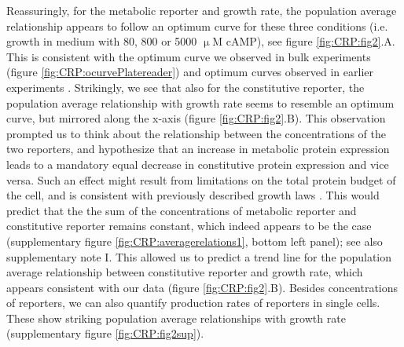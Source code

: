 Reassuringly,
for the metabolic reporter and growth rate,
the population average relationship appears to follow an optimum curve for these three conditions (i.e. growth in medium with 80, 800 or 5000 $\upmu$M cAMP), 
see figure \ref{fig:CRP:fig2}.A.
%
%
%
This is consistent with the optimum curve we observed in bulk experiments (figure \ref{fig:CRP:ocurvePlatereader}) and 
optimum curves observed in earlier experiments \cite{Towbin2017}.
%
Strikingly, we see that also for the constitutive reporter,
the population average relationship with growth rate seems to resemble an optimum curve,
but mirrored along the x-axis (figure \ref{fig:CRP:fig2}.B).
%
This observation prompted us to 
think about the relationship between the concentrations of the two reporters, 
and hypothesize that 
an increase in metabolic protein expression leads to a mandatory equal decrease in constitutive protein expression and vice versa.
%
Such an effect might 
result from
limitations on the total protein budget of the cell,
and is consistent with 
previously described growth laws \cite{You2013}.
%
This would predict that the 
the sum of the concentrations of metabolic reporter and constitutive reporter remains constant, 
which indeed appears to be the case (supplementary figure \ref{fig:CRP:averagerelations1}, bottom left panel); see also supplementary note I.
%
This allowed us to predict a trend line for the population average relationship between constitutive reporter and growth rate,
which appears consistent with our data (figure \ref{fig:CRP:fig2}.B). 
%
Besides concentrations of reporters,
we can also quantify production rates of reporters in single cells. 
These 
show striking population average relationships with growth rate (supplementary figure \ref{fig:CRP:fig2sup}).
